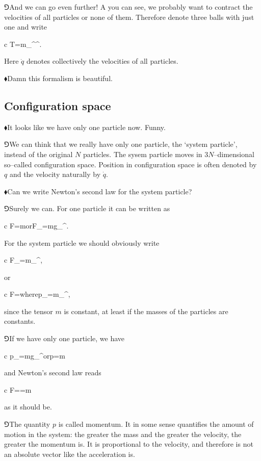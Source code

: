 \documentclass[10pt,oneside%
]{memoir}
\newenvironment{eqna}{\begin{IEEEeqnarray*}{c}}{\end{IEEEeqnarray*}\ignorespacesafterend}
\newcommand{\puoli}{\frac{1}{2}}
\newcommand{\orr}{\qquad\textrm{or}\qquad}
\newcommand{\wheree}{\qquad\textrm{where}\qquad}
\newcommand{\coa}{{\color{black}\bullet}}
\newcommand{\cob}{{\color{oranssi}\bullet}}
\newcommand{\hea}{\(\blacklozenge\)\;}
\newcommand{\heb}{\(\Game\)\;}
\begin{document}
\heb And we can go even further! A you can see, we probably want to contract the velocities of all particles or none of them. Therefore denote three balls with just one and write
\begin{eqna}
    T=\puoli m_{\coa\cob}^\coa{}^\cob.
\end{eqna}
Here \(\dot{q}\) denotes collectively the velocities of all particles.

\hea Damn this formalism is beautiful.
\subsection{Configuration space}
\hea It looks like we have only one particle now. Funny.

\heb We can think that we really have only one particle, the `system particle', instead of the original \(N\) particles. The sysem particle moves in \(3N\)--dimensional so--called configuration space. Position in configuration space is often denoted by \(q\) and the velocity naturally by \(\dot{q}\).

\hea Can we write Newton's second law for the system particle?

\heb Surely we can. For one particle it can be written as
\begin{eqna}
    F=m\orr F_\coa=mg_{\coa\cob}^\cob.
\end{eqna}
For the system particle we should obviously write
\begin{eqna}
    F_\coa=m_{\coa\cob}^\cob,
\end{eqna}
or
\begin{eqna}
    F=\wheree p_\coa=m_{\coa\cob}^\coa,
\end{eqna}
since the tensor \(m\) is constant, at least if the masses of the particles are constants.

\heb If we have only one particle, we have
\begin{eqna}
    p_\coa=mg_{\coa\cob}^\cob\orr p=m
\end{eqna}
and Newton's second law reads
\begin{eqna}
    F==m
\end{eqna}
as it should be.

\heb The quantity \(p\) is called momentum. It in some sense quantifies the amount of motion in the system: the greater the mass and the greater the velocity, the greater the momentum is. It is proportional to the velocity, and therefore is not an absolute vector like the acceleration is.
\end{document}
